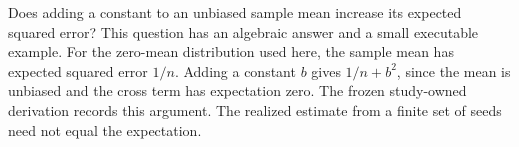 Does adding a constant to an unbiased sample mean increase its expected squared
error? This question has an algebraic answer and a small executable example.
For the zero-mean distribution used here, the sample mean has expected squared
error $1/n$. Adding a constant $b$ gives $1/n+b^2$, since the mean is unbiased
and the cross term has expectation zero. The frozen study-owned derivation
records this argument. The realized estimate from a finite set of seeds need
not equal the expectation.
